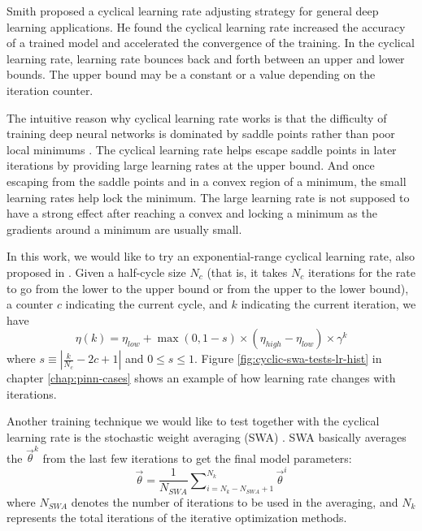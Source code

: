 Smith \cite{smith_cyclical_2017} proposed a cyclical learning rate adjusting strategy for general deep learning applications.
He found the cyclical learning rate increased the accuracy of a trained model and accelerated the convergence of the training.
In the cyclical learning rate, learning rate bounces back and forth between an upper and lower bounds.
The upper bound may be a constant or a value depending on the iteration counter.

The intuitive reason why cyclical learning rate works is that the difficulty of training deep neural networks is dominated by saddle points rather than poor local minimums \cite{dauphin_identifying_2014}.
The cyclical learning rate helps escape saddle points in later iterations by providing large learning rates at the upper bound.
And once escaping from the saddle points and in a convex region of a minimum, the small learning rates help lock the minimum.
The large learning rate is not supposed to have a strong effect after reaching a convex and locking a minimum as the gradients around a minimum are usually small.

In this work, we would like to try an exponential-range cyclical learning rate, also proposed in \cite{smith_cyclical_2017}.
Given a half-cycle size $N_c$ (that is, it takes $N_c$ iterations for the rate to go from the lower to the upper bound or from the upper to the lower bound), a counter $c$ indicating the current cycle, and $k$ indicating the current iteration, we have
\begin{equation}
    \eta(k) = \eta_{low} + \max(0, 1-s)\times(\eta_{high}-\eta_{low})\times\gamma^k
\end{equation}
where $s \equiv \left\lvert \frac{k}{N_c} - 2c + 1\right\rvert$ and $0 \le s \le 1$.
Figure \ref{fig:cyclic-swa-tests-lr-hist} in chapter \ref{chap:pinn-cases} shows an example of how learning rate changes with iterations. 

Another training technique we would like to test together with the cyclical learning rate is the stochastic weight averaging (SWA) \cite{izmailov_averaging_2019}.
SWA basically averages the $\vec{\theta}^k$ from the last few iterations to get the final model parameters:
\begin{equation}
    \vec{\theta} = \frac{1}{N_{SWA}}\sum\nolimits_{i=N_k-N_{SWA}+1}^{N_k} \vec{\theta}^i
\end{equation}
where $N_{SWA}$ denotes the number of iterations to be used in the averaging, and $N_k$ represents the total iterations of the iterative optimization methods.

